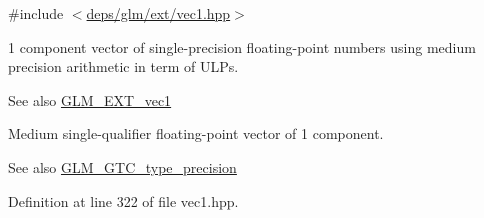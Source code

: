 {\ttfamily \#include $<$\hyperlink{ext_2vec1_8hpp}{deps/glm/ext/vec1.\+hpp}$>$}

1 component vector of single-\/precision floating-\/point numbers using medium precision arithmetic in term of U\+L\+Ps.

\begin{DoxySeeAlso}{See also}
\hyperlink{group__ext__vec1}{G\+L\+M\+\_\+\+E\+X\+T\+\_\+vec1}
\end{DoxySeeAlso}
Medium single-\/qualifier floating-\/point vector of 1 component. \begin{DoxySeeAlso}{See also}
\hyperlink{group__gtc__type__precision}{G\+L\+M\+\_\+\+G\+T\+C\+\_\+type\+\_\+precision} 
\end{DoxySeeAlso}


Definition at line 322 of file vec1.\+hpp.

